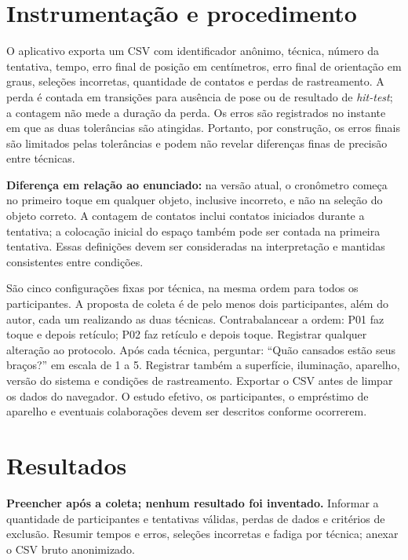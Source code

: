 \documentclass[11pt,a4paper]{article}
\begin{document}
\section{Instrumentação e procedimento}
O aplicativo exporta um CSV com identificador anônimo, técnica, número da tentativa, tempo, erro final de posição em centímetros, erro final de orientação em graus, seleções incorretas, quantidade de contatos e perdas de rastreamento. A perda é contada em transições para ausência de pose ou de resultado de \textit{hit-test}; a contagem não mede a duração da perda. Os erros são registrados no instante em que as duas tolerâncias são atingidas. Portanto, por construção, os erros finais são limitados pelas tolerâncias e podem não revelar diferenças finas de precisão entre técnicas.

\textbf{Diferença em relação ao enunciado:} na versão atual, o cronômetro começa no primeiro toque em qualquer objeto, inclusive incorreto, e não na seleção do objeto correto. A contagem de contatos inclui contatos iniciados durante a tentativa; a colocação inicial do espaço também pode ser contada na primeira tentativa. Essas definições devem ser consideradas na interpretação e mantidas consistentes entre condições.

São cinco configurações fixas por técnica, na mesma ordem para todos os participantes. A proposta de coleta é de pelo menos dois participantes, além do autor, cada um realizando as duas técnicas. Contrabalancear a ordem: P01 faz toque e depois retículo; P02 faz retículo e depois toque. Registrar qualquer alteração ao protocolo. Após cada técnica, perguntar: ``Quão cansados estão seus braços?'' em escala de 1 a 5. Registrar também a superfície, iluminação, aparelho, versão do sistema e condições de rastreamento. Exportar o CSV antes de limpar os dados do navegador. O estudo efetivo, os participantes, o empréstimo de aparelho e eventuais colaborações devem ser descritos conforme ocorrerem.

\section{Resultados}
\textbf{Preencher após a coleta; nenhum resultado foi inventado.} Informar a quantidade de participantes e tentativas válidas, perdas de dados e critérios de exclusão. Resumir tempos e erros, seleções incorretas e fadiga por técnica; anexar o CSV bruto anonimizado.
\end{document}
